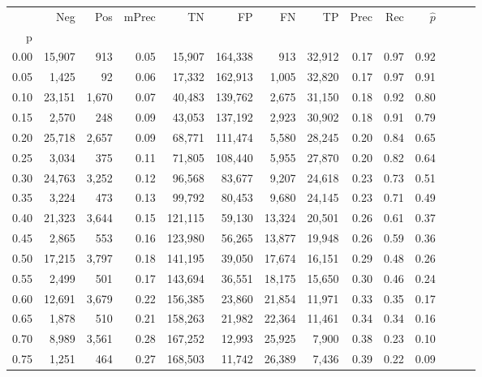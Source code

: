 \begin{tabular}{rrrrrrrrrrrrrr}
\toprule
{} &     Neg &    Pos & mPrec &       TN &       FP &      FN &      TP &  Prec &   Rec & $\hat{p}$ \\
p    &         &        &       &          &          &         &         &       &       &           \\
\midrule
0.00 &  15,907 &    913 &  0.05 &   15,907 &  164,338 &     913 &  32,912 &  0.17 &  0.97 &      0.92 \\
0.05 &   1,425 &     92 &  0.06 &   17,332 &  162,913 &   1,005 &  32,820 &  0.17 &  0.97 &      0.91 \\
0.10 &  23,151 &  1,670 &  0.07 &   40,483 &  139,762 &   2,675 &  31,150 &  0.18 &  0.92 &      0.80 \\
0.15 &   2,570 &    248 &  0.09 &   43,053 &  137,192 &   2,923 &  30,902 &  0.18 &  0.91 &      0.79 \\
0.20 &  25,718 &  2,657 &  0.09 &   68,771 &  111,474 &   5,580 &  28,245 &  0.20 &  0.84 &      0.65 \\
0.25 &   3,034 &    375 &  0.11 &   71,805 &  108,440 &   5,955 &  27,870 &  0.20 &  0.82 &      0.64 \\
0.30 &  24,763 &  3,252 &  0.12 &   96,568 &   83,677 &   9,207 &  24,618 &  0.23 &  0.73 &      0.51 \\
0.35 &   3,224 &    473 &  0.13 &   99,792 &   80,453 &   9,680 &  24,145 &  0.23 &  0.71 &      0.49 \\
0.40 &  21,323 &  3,644 &  0.15 &  121,115 &   59,130 &  13,324 &  20,501 &  0.26 &  0.61 &      0.37 \\
0.45 &   2,865 &    553 &  0.16 &  123,980 &   56,265 &  13,877 &  19,948 &  0.26 &  0.59 &      0.36 \\
0.50 &  17,215 &  3,797 &  0.18 &  141,195 &   39,050 &  17,674 &  16,151 &  0.29 &  0.48 &      0.26 \\
0.55 &   2,499 &    501 &  0.17 &  143,694 &   36,551 &  18,175 &  15,650 &  0.30 &  0.46 &      0.24 \\
0.60 &  12,691 &  3,679 &  0.22 &  156,385 &   23,860 &  21,854 &  11,971 &  0.33 &  0.35 &      0.17 \\
0.65 &   1,878 &    510 &  0.21 &  158,263 &   21,982 &  22,364 &  11,461 &  0.34 &  0.34 &      0.16 \\
0.70 &   8,989 &  3,561 &  0.28 &  167,252 &   12,993 &  25,925 &   7,900 &  0.38 &  0.23 &      0.10 \\
0.75 &   1,251 &    464 &  0.27 &  168,503 &   11,742 &  26,389 &   7,436 &  0.39 &  0.22 &      0.09 \\

\end{tabular}
